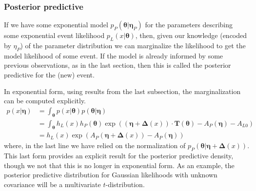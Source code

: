 \documentclass[aps,showpacs,twocolumn,prd,superscriptaddress,nofootinbib]{revtex4}
\newcommand{\nn}{\nonumber}
\begin{document}
\subsubsection{Posterior predictive}

If we have some exponential model $p_P(\bm\theta|\bm\eta_P)$ for the parameters describing some exponential event likelihood $p_L(x|\bm\theta)$, then, given our knowledge (encoded by $\eta_P$) of the parameter distribution we can marginalize the likelihood to get the model likelihood of some event.  If the model is already informed by some previous observations, as in the last section, then this is called the posterior predictive for the (new) event.

In exponential form, using results from the last subsection, the marginalization can be computed explicitly.
\begin{align}
  p(x|\bm\eta)&=\int_{\bm\theta}p(x|\bm\theta)p(\bm\theta|\bm\eta)\nn\\
  &=\int_{\bm\theta}h_L(x)h_P(\bm\theta)\exp\left((\bm\eta+\bm\Delta(x))\cdot\bm T(\bm\theta)-A_P(\bm\eta)-A_{L0}\right)\nn\\
  &=h_L(x)\exp\left(A_P(\bm\eta+\bm\Delta(x))-A_P(\bm\eta)\right)\label{eq:exp-predictive}
\end{align}
where, in the last line we have relied on the normalization of $p_P(\bm\theta|\bm\eta+\bm\Delta(x))$. This last form provides an explicit result for the posterior predictive density, though we not that this is no longer in exponential form. As an example, the posterior predictive distribution for Gaussian likelihoods with unknown covariance will be a multivariate $t$-distribution.
\end{document}
